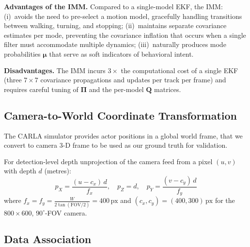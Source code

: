 \documentclass[conference]{IEEEtran}
\begin{document}
\textbf{Advantages of the IMM.} Compared to a single-model EKF, the IMM:
(i)~avoids the need to pre-select a motion model, gracefully handling transitions between walking, turning, and stopping;
(ii)~maintains separate covariance estimates per mode, preventing the covariance inflation that occurs when a single filter must accommodate multiple dynamics;
(iii)~naturally produces mode probabilities $\bm{\mu}$ that serve as soft indicators of behavioral intent.

\textbf{Disadvantages.} The IMM incurs $3\times$ the computational cost of a single EKF (three $7{\times}7$ covariance propagations and updates per track per frame) and requires careful tuning of $\bm{\Pi}$ and the per-model $\mathbf{Q}$ matrices.

\subsection{Camera-to-World Coordinate Transformation}
\label{sec:coords}

The CARLA simulator provides actor positions in a global world frame, that we convert to camera 3-D frame to be used as our ground truth for validation.

For detection-level depth unprojection of the camera feed from a pixel $(u, v)$ with depth $d$ (metres):
\begin{equation}
\label{eq:unproj}
p_X = \frac{(u - c_x)\,d}{f_x}, \quad p_Z = d, \quad p_Y = \frac{(v - c_y)\,d}{f_y}
\end{equation}
where $f_x = f_y = \frac{W}{2\tan(\text{FOV}/2)} = 400\,\text{px}$ and $(c_x, c_y) = (400, 300)\,\text{px}$ for the $800{\times}600$, $90^\circ$-FOV camera.

\subsection{Data Association}
\label{sec:assoc}
\end{document}
